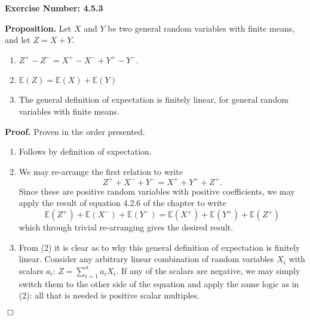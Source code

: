 \documentclass{article}
\begin{document}
\noindent \textbf{Exercise Number: 4.5.3}  %

\medskip 

\noindent \textbf{Proposition.} Let $X$ and $Y$ be two general random variables with finite means, and let $Z = X + Y$. 

\begin{enumerate}

\item $Z^+ - Z^- = X^+ - X^- + Y^+ - Y^-$. 

\item $\mathbb{E}(Z) = \mathbb{E}(X) + \mathbb{E}(Y)$

\item The general definition of expectation is finitely linear, for general random variables with finite means. 

\end{enumerate}

\bigskip

\noindent \textbf{Proof.} Proven in the order presented.  

\begin{enumerate}

\item Follows by definition of expectation. 

\item We may re-arrange the first relation to write \[Z^+ + X^- + Y^- = X^+  + Y^+ + Z^+.\] Since these are positive random variables with positive coefficients, we may apply the result of equation 4.2.6 of the chapter to write \[\mathbb{E}(Z^+) + \mathbb{E}(X^-) + \mathbb{E}(Y^-) = \mathbb{E}(X^+)  + \mathbb{E}(Y^+) + \mathbb{E}(Z^+)\] which through trivial re-arranging gives the desired result. 

\item From (2) it is clear as to why this general definition of expectation is finitely linear. Consider any arbitrary linear combination of random variables $X_i$ with scalars $a_i$: $Z = \sum_{i = 1}^n a_i X_i$. If any of the scalars are negative, we may simply switch them to the other side of the equation and apply the same logic as in (2): all that is needed is positive scalar multiples. 

\end{enumerate}

\hfill $\Box$
\end{document}
